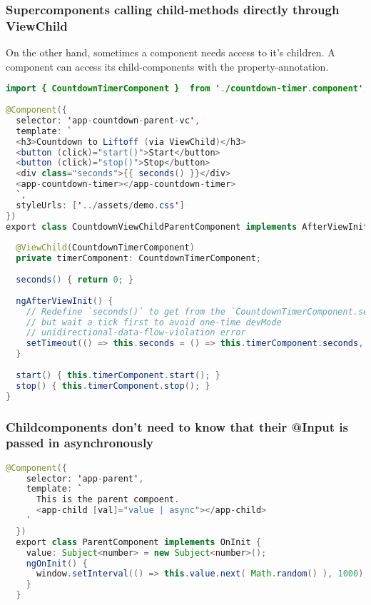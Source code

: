 \subsubsection{Supercomponents calling child-methods directly through ViewChild}
On the other hand, sometimes a component needs access to it's children. A component can access its child-components with the  property-annotation.
\begin{lstlisting}[language=java]
import { CountdownTimerComponent }  from './countdown-timer.component';
 
@Component({
  selector: 'app-countdown-parent-vc',
  template: `
  <h3>Countdown to Liftoff (via ViewChild)</h3>
  <button (click)="start()">Start</button>
  <button (click)="stop()">Stop</button>
  <div class="seconds">{{ seconds() }}</div>
  <app-countdown-timer></app-countdown-timer>
  `,
  styleUrls: ['../assets/demo.css']
})
export class CountdownViewChildParentComponent implements AfterViewInit {
 
  @ViewChild(CountdownTimerComponent)
  private timerComponent: CountdownTimerComponent;
 
  seconds() { return 0; }
 
  ngAfterViewInit() {
    // Redefine `seconds()` to get from the `CountdownTimerComponent.seconds` ...
    // but wait a tick first to avoid one-time devMode
    // unidirectional-data-flow-violation error
    setTimeout(() => this.seconds = () => this.timerComponent.seconds, 0);
  }
 
  start() { this.timerComponent.start(); }
  stop() { this.timerComponent.stop(); }
}
\end{lstlisting}


\subsubsection{Childcomponents don't need to know that their @Input is passed in asynchronously}

\begin{lstlisting}[language=java, caption=Parent]
  @Component({
    selector: 'app-parent',
    template: `
      This is the parent compoent. 
      <app-child [val]="value | async"></app-child>
    `
  })
  export class ParentComponent implements OnInit {
    value: Subject<number> = new Subject<number>();
    ngOnInit() {
      window.setInterval(() => this.value.next( Math.random() ), 1000);
    }
  }
\end{lstlisting}

